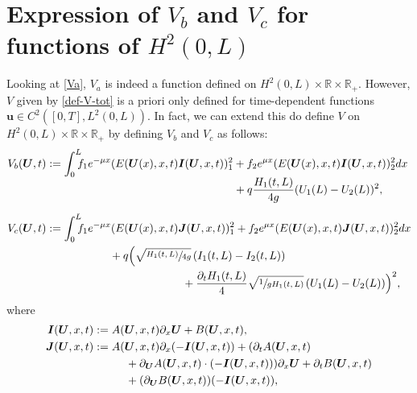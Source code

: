 \documentclass[JEP,XML,SOM,Unicode]{cedram}
\theoremstyle{definition}
\begin{document}
\section{Expression of \texorpdfstring{$V_{b}$ and $V_{c}$ for functions of $H^{2}(0,L)$}{V}}
\label{sec:VbVc}
Looking at \eqref{Va}, $V_{a}$ is indeed a function defined on $H^{2}(0,L)\times\mathbb{R}\times\mathbb{R}_{+}$. However, $V$ given by \eqref{def-V-tot} is a priori only defined for time-dependent functions $\boldsymbol{u}\in C^{2}([0,T],L^{2}(0,L))$. In fact, we can extend this do define $V$ on $H^{2}(0,L)\times\mathbb{R}\times \mathbb{R}_{+}$ by defining $V_{b}$ and $V_{c}$ as follows:
\begin{align}
V_{b}(\boldsymbol{U},t)&:=\int_{0}^{L}\hspace*{-2mm}f_{1}e^{-\mu x}(E(\boldsymbol{U}(x),x,t)\boldsymbol{I}(\boldsymbol{U},x,t))^{2}_{1}+f_{2}e^{\mu x}(E(\boldsymbol{U}(x),x,t)\boldsymbol{I}(\boldsymbol{U},x,t))^{2}_{2}dx\notag\\[-4pt]
&\hspace*{5.92cm}+q\frac{H_{1}(t,L)}{4g}(U_{1}(L)-U_{2}(L))^{2},\notag\\[-5pt]\label{V2V3}\\[-5pt]
V_{c}(\boldsymbol{U},t)&:=\int_{0}^{L}\hspace*{-2mm}f_{1}e^{-\mu x}(E(\boldsymbol{U}(x),x,t)\boldsymbol{J}(\boldsymbol{U},x,t))^{2}_{1}+f_{2}e^{\mu x}(E(\boldsymbol{U}(x),x,t)\boldsymbol{J}(\boldsymbol{U},x,t))^{2}_{2}dx\notag\\
&\hspace*{2cm}+q\Bigl(\sqrt{\sfrac{H_{1}(t,L)}{4g}}\,(I_{1}(t,L)-I_{2}(t,L))\notag\\
&\hspace*{4.3cm}+\frac{\partial_{t}H_{1}(t,L)}{4}\sqrt{\sfrac{1}{gH_{1}(t,L)}}\,(U_{1}(L)-U_{2}(L)) \Bigr)^{2},\notag
\end{align}
where
\begin{equation}
\begin{split}
\boldsymbol{I}(\boldsymbol{U},x,t)&:=A(\boldsymbol{U},x,t)\partial_{x}\boldsymbol{U}+B(\boldsymbol{U},x,t),\\
\boldsymbol{J}(\boldsymbol{U},x,t)&:=A(\boldsymbol{U},x,t)\partial_{x}(-\boldsymbol{I}(\boldsymbol{U},x,t))+(\partial_{t}A(\boldsymbol{U},x,t)\\
&\hspace*{1cm}+\partial_{\boldsymbol{U}}A(\boldsymbol{U},x,t)\cdot(-\boldsymbol{I}(\boldsymbol{U},x,t)))\partial_{x}\boldsymbol{U}+\partial_{t}B(\boldsymbol{U},x,t)\\
&\hspace*{1cm}+(\partial_{\boldsymbol{U}}B(\boldsymbol{U},x,t))({-\boldsymbol{I}(\boldsymbol{U},x,t)}),
\end{split}
\label{IJ}
\end{equation}
\end{document}
